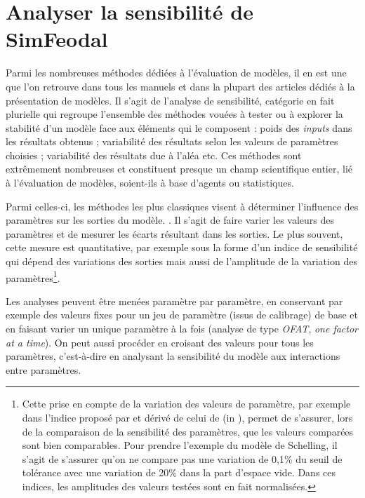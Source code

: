 \clearpage
\section{Analyser la sensibilité de SimFeodal \label{sec:ana-sensib}}

Parmi les nombreuses méthodes dédiées à l'évaluation de modèles, il en est une que l'on retrouve dans tous les manuels et dans la plupart des articles dédiés à la présentation de modèles.
Il s'agit de l'analyse de sensibilité, catégorie en fait plurielle qui regroupe l'ensemble des méthodes vouées à tester ou à explorer la stabilité d'un modèle face aux éléments qui le composent :
poids des \textit{inputs} dans les résultats obtenus ; variabilité des résultats selon les valeurs de paramètres choisies ; variabilité des résultats due à l'aléa etc.
Ces méthodes sont extrêmement nombreuses et constituent presque un champ scientifique entier, lié à l'évaluation de modèles, soient-ils à base d'agents ou statistiques.

Parmi celles-ci, les méthodes les plus classiques \autocite[257]{crooks_agent-based_2019} visent à \og déterminer l'influence des paramètres sur les sorties du modèle.\fg{} \autocite[75]{ginot2005explorer}.
Il s'agit de faire varier les valeurs des paramètres et de mesurer les écarts résultant dans les sorties.
Le plus souvent, cette mesure est quantitative, par exemple sous la forme d'un \og indice de sensibilité\fg{} qui dépend des variations des sorties mais aussi de l'amplitude de la variation des paramètres\footnote{
	Cette prise en compte de la variation des valeurs de paramètre, par exemple dans l'indice proposé par \textcite[258]{crooks_agent-based_2019} et dérivé de celui de \textcite{hamby_review_1994} (in \cite[201]{osullivan_spatial_2013}), permet de s'assurer, lors de la comparaison de la sensibilité des paramètres, que les valeurs comparées sont bien comparables.
	Pour prendre l'exemple du modèle de Schelling, il s'agit de s'assurer qu'on ne compare pas une variation de 0,1\% du seuil de tolérance avec une variation de 20\% dans la part d'espace vide.
	Dans ces indices, les amplitudes des valeurs testées sont en fait normalisées.
}.

Les analyses peuvent être menées paramètre par paramètre, en conservant par exemple des valeurs fixes pour un jeu de paramètre (issus de calibrage) de base et en faisant varier un unique paramètre à la fois (analyse de type \textit{OFAT}, \og \textit{one factor at a time}\fg{}).
On peut aussi procéder en croisant des valeurs pour tous les paramètres, c'est-à-dire en analysant la sensibilité du modèle aux interactions entre paramètres.


